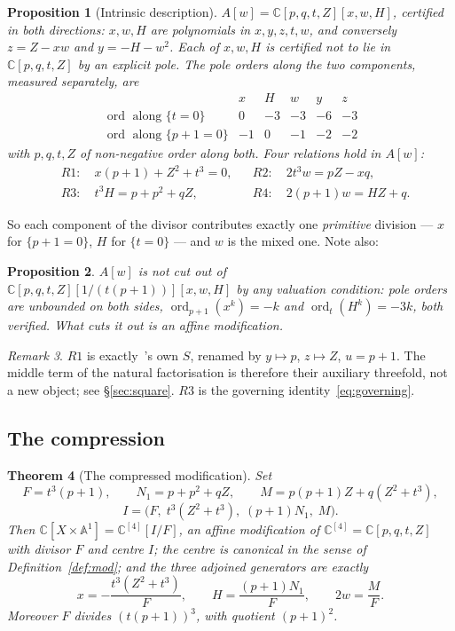 \documentclass[11pt]{article}
\newtheorem{theorem}{Theorem}[section]
\newtheorem{proposition}[theorem]{Proposition}
\theoremstyle{definition}
\theoremstyle{remark}
\newtheorem{remark}[theorem]{Remark}
\newcommand{\C}{\mathbb{C}}
\newcommand{\Aff}[1]{\mathbb{A}^{#1}}
\newcommand{\ord}{\operatorname{ord}}
\begin{document}
\begin{proposition}[Intrinsic description]\label{prop:intrinsic}
$A[w]=\C[p,q,t,Z][x,w,H]$, certified in both directions: $x,w,H$ are
polynomials in $x,y,z,t,w$, and conversely $z=Z-xw$ and $y=-H-w^2$. Each of
$x,w,H$ is certified not to lie in $\C[p,q,t,Z]$ by an explicit pole. The
pole orders along the two components, measured separately, are
\[
\begin{array}{l|ccccc}
 & x & H & w & y & z\\\hline
\ord \text{ along } \{t=0\} & 0 & -3 & -3 & -6 & -3\\
\ord \text{ along } \{p+1=0\} & -1 & 0 & -1 & -2 & -2
\end{array}
\]
with $p,q,t,Z$ of non-negative order along both. Four relations hold in
$A[w]$:
\begin{align}
&R1:\quad x(p+1)+Z^2+t^3=0, &&R2:\quad 2t^3w=pZ-xq,\label{eq:R12}\\
&R3:\quad t^3H=p+p^2+qZ, &&R4:\quad 2(p+1)w=HZ+q.\label{eq:R34}
\end{align}
\end{proposition}

So each component of the divisor contributes exactly one \emph{primitive}
division --- $x$ for $\{p+1=0\}$, $H$ for $\{t=0\}$ --- and $w$ is the mixed
one. Note also:

\begin{proposition}\label{prop:novaluation}
$A[w]$ is not cut out of $\C[p,q,t,Z][1/(t(p+1))][x,w,H]$ by any valuation
condition: pole orders are unbounded on both sides,
$\ord_{p+1}(x^k)=-k$ and $\ord_t(H^k)=-3k$, both verified. What cuts it out is
an affine modification.
\end{proposition}

\begin{remark}
$R1$ is exactly~\cite{DMJP2009}'s own $S$, renamed by $y\mapsto p$,
$z\mapsto Z$, $u=p+1$. The middle term of the natural factorisation is
therefore their auxiliary threefold, not a new object; see
\S\ref{sec:square}. $R3$ is the governing identity~\eqref{eq:governing}.
\end{remark}

\subsection{The compression}

\begin{theorem}[The compressed modification]\label{thm:compression}
Set
\[
F=t^3(p+1),\qquad
N_1=p+p^2+qZ,\qquad
M=p(p+1)Z+q(Z^2+t^3),
\]
\[
I=\bigl(F,\;t^3(Z^2+t^3),\;(p+1)N_1,\;M\bigr).
\]
Then $\C[X\times\Aff{1}]=\C^{[4]}[I/F]$, an affine modification of
$\C^{[4]}=\C[p,q,t,Z]$ with divisor $F$ and centre $I$; the centre is
canonical in the sense of Definition~\ref{def:mod}; and the three adjoined
generators are exactly
\[
x=-\frac{t^3(Z^2+t^3)}{F},\qquad H=\frac{(p+1)N_1}{F},\qquad
2w=\frac{M}{F}.
\]
Moreover $F$ divides $(t(p+1))^3$, with quotient $(p+1)^2$.
\end{theorem}
\end{document}

